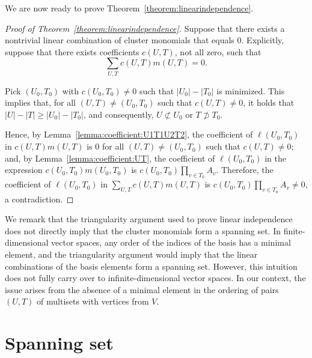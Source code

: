 \documentclass[11pt]{article}
\theoremstyle{definition}
\numberwithin{equation}{section}
\newcommand{\vertices}{V}
\newcommand{\laurentmonomial}[2]{\ell(#1, #2)}
\newcommand{\monomial}[2]{m(#1, #2)}
\newcommand{\coefficient}[2]{c(#1, #2)}
\begin{document}
We are now ready to prove Theorem~\ref{theorem:linearindependence}.

\begin{proof}[Proof of Theorem~\ref{theorem:linearindependence}]
    Suppose that there exists a nontrivial linear combination of cluster monomials that equals \(0\).
    Explicitly, suppose that there exists coefficients \(\coefficient{U}{T}\), not all zero, such that
    \begin{equation*}
        \sum_{U, T} \coefficient{U}{T} \monomial{U}{T} = 0.
    \end{equation*}

    Pick \((U_0, T_0)\) with \(\coefficient{U_0}{T_0} \neq 0\) such that \(|U_0| - |T_0|\) is minimized.
    This implies that, for all \((U, T) \neq (U_0, T_0)\) such that \(\coefficient{U}{T} \neq 0\),
    it holds that \(|U| - |T| \geq |U_0| - |T_0|\), and consequently, \(U \not\subset U_0\) or \(T \not\supset T_0\).

    Hence, by Lemma~\ref{lemma:coefficient:U1T1U2T2}, the coefficient of \(\laurentmonomial{U_0}{T_0}\) in 
    \( \coefficient{U}{T} \monomial{U}{T} \)
    is \(0\)
    for all \((U, T) \neq (U_0, T_0)\) such that \(\coefficient{U}{T} \neq 0\);
    and, by Lemma~\ref{lemma:coefficient:UT}, the coefficient of \(\laurentmonomial{U_0}{T_0}\) in the expression
    \( \coefficient{U_0}{T_0} \monomial{U_0}{T_0} \)
    is 
    \( \coefficient{U_0}{T_0} \prod_{v \in T_0} A_v \).
    Therefore, the coefficient of \(\laurentmonomial{U_0}{T_0}\) in
    \( \sum_{U, T} \coefficient{U}{T} \monomial{U}{T} \)
    is
    \( \coefficient{U_0}{T_0} \prod_{v \in T_0} A_v \neq 0\),
    a contradiction.
\end{proof}

We remark that the triangularity argument used to prove linear independence does not directly imply that the cluster monomials form a spanning set.
In finite-dimensional vector spaces, any order of the indices of the basis has a minimal element,
and the triangularity argument would imply that the linear combinations of the basis elements form a spanning set.
However, this intuition does not fully carry over to infinite-dimensional vector spaces.
In our context, the issue arises from the absence of a minimal element in the ordering of pairs \((U, T)\) of multisets with vertices from \(\vertices\).

\section{Spanning set} \label{section:spanningset}
\end{document}
